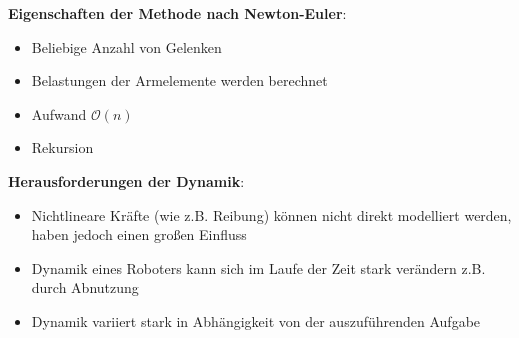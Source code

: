 \textbf{Eigenschaften der Methode nach Newton-Euler}:
\begin{itemize}
	\item Beliebige Anzahl von Gelenken
	\item Belastungen der Armelemente werden berechnet
	\item Aufwand $\mathcal{O}(n)$
	\item Rekursion
\end{itemize}
\bigskip
\textbf{Herausforderungen der Dynamik}:
\begin{itemize}
	\item Nichtlineare Kräfte (wie z.B. Reibung) können nicht direkt modelliert werden, haben jedoch einen großen Einfluss
	\item Dynamik eines Roboters kann sich im Laufe der Zeit stark verändern z.B. durch Abnutzung
	\item Dynamik variiert stark in Abhängigkeit von der auszuführenden Aufgabe
\end{itemize}
\pagebreak